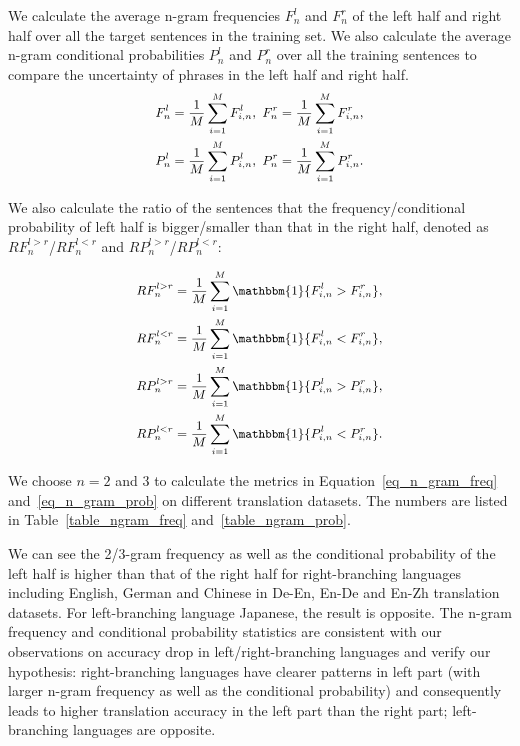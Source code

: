 \documentclass[11pt,a4paper]{article}
\begin{document}
We calculate the average n-gram frequencies $F^{l}_{n}$ and $F^{r}_{n}$ of the left half and right half over all the target sentences in the training set. We also calculate the average n-gram conditional probabilities $P^{l}_{n}$ and $P^{r}_{n}$ over all the training sentences to compare the uncertainty of phrases in the left half and right half.
\begin{equation}
\small
\begin{aligned}
\label{eq_n_gram_freq}
F^{l}_{n} &=\frac{1}{M}\sum^{M}_{i=1} F^{l}_{i,n}, ~ F^{r}_{n} =\frac{1}{M}\sum^{M}_{i=1} F^{r}_{i,n}, \\
P^{l}_{n} &= \frac{1}{M} \sum^{M}_{i=1} P^{l}_{i,n}, ~ P^{r}_{n} =\frac{1}{M} \sum^{M}_{i=1} P^{r}_{i,n}. \\
\end{aligned}
\end{equation}

We also calculate the ratio of the sentences that the frequency/conditional probability of left half is bigger/smaller than that in the right half, denoted as $RF^{l>r}_{n}$/$RF^{l<r}_{n}$ and $RP^{l>r}_{n}$/$RP^{l<r}_{n}$:

\begin{equation}
\small
\begin{aligned}
\label{eq_n_gram_prob}
RF^{l>r}_{n} &=\frac{1}{M}\sum^{M}_{i=1} \mathbbm{1}\{F^{l}_{i,n} > F^{r}_{i,n}\},  \\
RF^{l<r}_{n} &=\frac{1}{M}\sum^{M}_{i=1} \mathbbm{1}\{F^{l}_{i,n} < F^{r}_{i,n}\}, \\
RP^{l>r}_{n} &=\frac{1}{M}\sum^{M}_{i=1} \mathbbm{1}\{P^{l}_{i,n} > P^{r}_{i,n}\},  \\
RP^{l<r}_{n} &=\frac{1}{M}\sum^{M}_{i=1} \mathbbm{1}\{P^{l}_{i,n} < P^{r}_{i,n}\}. \\
\end{aligned}
\end{equation}

We choose $n=2$ and $3$ to calculate the metrics in Equation~\ref{eq_n_gram_freq} and~\ref{eq_n_gram_prob} on different translation datasets. The numbers are listed in Table~\ref{table_ngram_freq} and~\ref{table_ngram_prob}.

We can see the 2/3-gram frequency as well as the conditional probability of the left half is higher than that of the right half for right-branching languages including English, German and Chinese in De-En, En-De and En-Zh translation datasets. For left-branching language Japanese, the result is opposite. The n-gram frequency and conditional probability statistics are consistent with our observations on accuracy drop in left/right-branching languages and verify our hypothesis: right-branching languages have clearer patterns in left part (with larger n-gram frequency as well as the conditional probability) and consequently leads to higher translation accuracy in the left part than the right part; left-branching languages are opposite.
\end{document}
